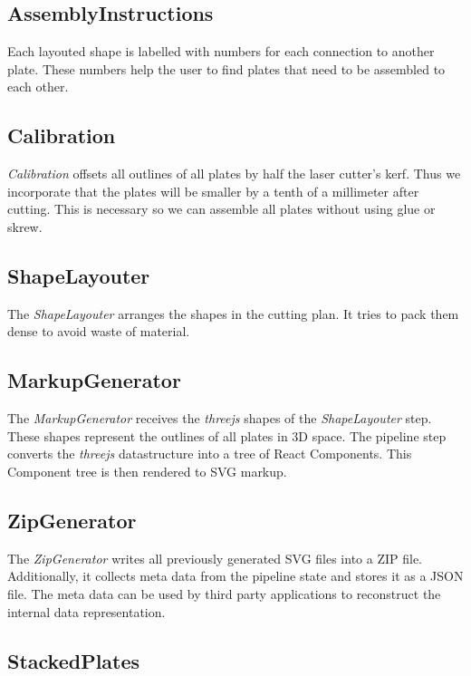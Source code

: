 \documentclass[../ClassicThesis.tex]{subfiles}
\begin{document}
\subsection*{AssemblyInstructions}

Each layouted shape is labelled with numbers for each connection to another plate. These numbers help the user to find plates that need to be assembled to each other.


\subsection*{Calibration}

\emph{Calibration} offsets all outlines of all plates by half the laser cutter’s kerf. Thus we incorporate that the plates will be smaller by a tenth of a millimeter after cutting. This is necessary so we can assemble all plates without using glue or skrew.


\subsection*{ShapeLayouter}

The \emph{ShapeLayouter} arranges the shapes in the cutting plan. It tries to pack them dense to avoid waste of material.


\subsection*{MarkupGenerator}

The \emph{MarkupGenerator} receives the \emph{threejs} shapes of the \emph{ShapeLayouter} step. These shapes represent the outlines of all plates in 3D space. The pipeline step converts the \emph{threejs} datastructure into a tree of React Components. This Component tree is then rendered to SVG markup.


\subsection*{ZipGenerator}

The \emph{ZipGenerator} writes all previously generated SVG files into a ZIP file. Additionally, it collects meta data from the pipeline state and stores it as a JSON file. The meta data can be used by third party applications to reconstruct the internal data representation.


\subsection*{StackedPlates}
\end{document}
